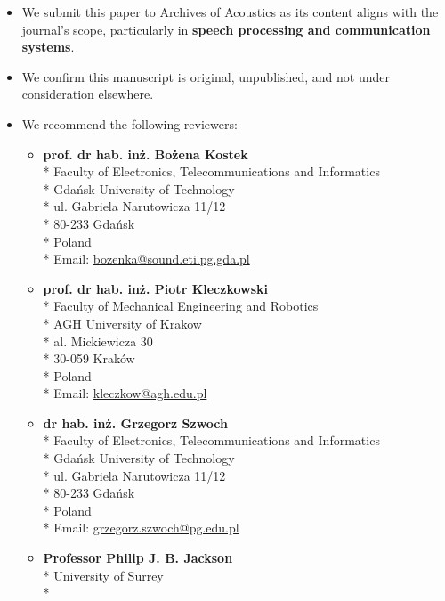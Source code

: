 \documentclass[a4paper,12pt]{article}
\begin{document}
\begin{itemize}
  \item We submit this paper to Archives of Acoustics as its content aligns with the journal's scope, particularly in \textbf{speech processing and communication systems}.
  \item We confirm this manuscript is original, unpublished, and not under consideration elsewhere.
  \item We recommend the following reviewers:
        \begin{itemize}
          \item \textbf{prof. dr hab. inż. Bożena Kostek} \\*
          Faculty of Electronics, Telecommunications and Informatics \\*
          Gdańsk University of Technology \\*
          ul. Gabriela Narutowicza 11/12 \\*
          80-233 Gdańsk \\*
          Poland \\*
          Email: \href{mailto:bozenka@sound.eti.pg.gda.pl}{bozenka@sound.eti.pg.gda.pl}
          \item \textbf{prof. dr hab. inż. Piotr Kleczkowski} \\*
          Faculty of Mechanical Engineering and Robotics \\*
          AGH University of Krakow \\*
          al. Mickiewicza 30 \\*
          30-059 Kraków \\*
          Poland \\*
          Email: \href{mailto:kleczkow@agh.edu.pl}{kleczkow@agh.edu.pl}
          \item \textbf{dr hab. inż. Grzegorz Szwoch} \\*
          Faculty of Electronics, Telecommunications and Informatics \\*
          Gdańsk University of Technology \\*
          ul. Gabriela Narutowicza 11/12 \\*
          80-233 Gdańsk \\*
          Poland \\*
          Email: \href{mailto:grzegorz.szwoch@pg.edu.pl}{grzegorz.szwoch@pg.edu.pl}
          \item \textbf{Professor Philip J. B. Jackson} \\*
          University of Surrey \\*

\end{itemize}
\end{itemize}
\end{document}
